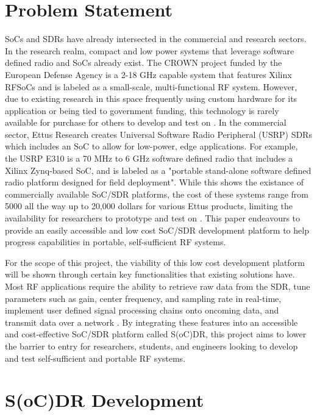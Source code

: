 \documentclass[conference]{IEEEtran}
\begin{document}
\section{Problem Statement}
SoCs and SDRs have already intersected in the commercial and research sectors. In the research realm, compact and low power systems that
leverage software defined radio and SoCs already exist. The CROWN project funded by the European Defense Agency is a 2-18 GHz capable system
that features Xilinx RFSoCs and is labeled as a small-scale, multi-functional RF system. However, due to existing research in this space
frequently using custom hardware for its application or being tied to government funding, this technology is rarely available for purchase
for others to develop and test on \cite{10880410}. In the commercial sector, Ettus Research creates Universal Software Radio Peripheral (USRP) SDRs
which includes an SoC to allow for low-power, edge applications. For example, the USRP E310 is a 70 MHz to 6 GHz software defined radio that 
includes a Xilinx Zynq-based SoC, and is labeled as a "portable stand-alone software defined radio platform designed for field deployment".
While this shows the existance of commercially available SoC/SDR platforms, the cost of these systems range from 5000 all the way up to 20,000 dollars for various
Ettus products, limiting the availability for researchers to prototype and test on \cite{ettus_e310}. This paper endeavours to provide an easily accessible and low cost
SoC/SDR development platform to help progress capabilities in portable, self-sufficient RF systems.

For the scope of this project, the viability of this low cost development platform will be shown through certain key functionalities that existing solutions have.
Most RF applications require the ability to retrieve raw data from the SDR, tune parameters such as gain, center frequency, and sampling rate in real-time, 
implement user defined signal processing chains onto oncoming data, and transmit data over a network \cite{10880410, 9721283}. By integrating these features into an accessible and cost-effective SoC/SDR platform called S(oC)DR, 
this project aims to lower the barrier to entry for researchers, students, and engineers looking to develop and test self-sufficient and portable RF systems.

\section{S(oC)DR Development}
\end{document}
